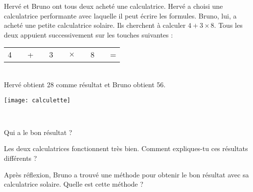 
\begin{activite}
 \begin{minipage}{0.6\textwidth}
Hervé et Bruno ont tous deux acheté une calculatrice. Hervé a choisi une calculatrice performante avec laquelle il peut écrire les formules. Bruno, lui, a acheté une petite calculatrice solaire. Ils cherchent à calculer $4 + 3 \times 8$.
Tous les deux appuient successivement sur les touches suivantes :  \\[0.5em]
\begin{tabular}{|c|c|c|c|c|c|c|c|c|c|c|}
\cline{1-1} \cline{3-3}\cline{5-5} \cline{7-7}\cline{9-9} \cline{11-11}
4 & & + & & 3 & & $\times$ & & 8 & & = \\ \cline{1-1} \cline{3-3}\cline{5-5} \cline{7-7}\cline{9-9} \cline{11-11}
\end{tabular} \\[0.5em]
Hervé obtient 28 comme résultat et Bruno obtient 56.
 \end{minipage} \hfill%
  \begin{minipage}{0.2\textwidth}
   \texttt{[image: calculette]}
   \end{minipage}\\
\begin{partie}
Qui a le bon résultat ?
\end{partie}
\begin{partie}
Les deux calculatrices fonctionnent très bien. Comment expliques-tu ces résultats différents ?
\end{partie}
\begin{partie}
Après réflexion, Bruno a trouvé une méthode pour obtenir le bon résultat avec sa calculatrice solaire. Quelle est cette méthode ?
\end{partie}
\end{activite}
